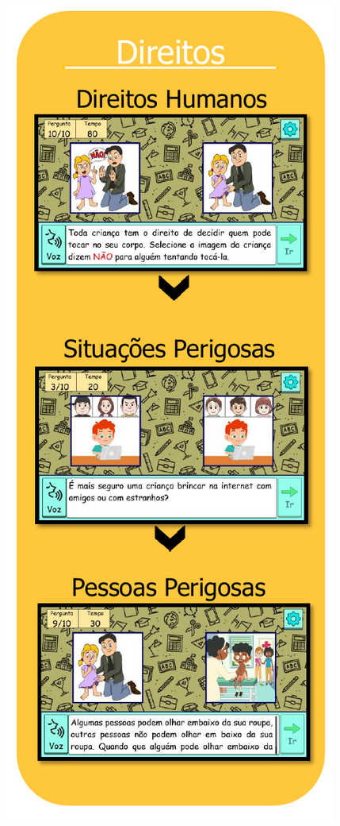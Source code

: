 \begin{figure}
  \includegraphics[width=\linewidth]{./Visuais/Escola2.pdf}
  \vspace{-1.0cm}
\end{figure}

